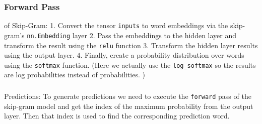\documentclass[
]{article}
\begin{document}
\hypertarget{forward-pass}{%
\subsubsection{Forward Pass}\label{forward-pass}}

of Skip-Gram: 1. Convert the tensor \texttt{inputs} to
word embeddings via the skip- gram's \texttt{nn.Embedding}
layer 2. Pass the embeddings to the hidden layer and transform the
result using the \texttt{relu} function 3. Transform the
hidden layer results using the output layer. 4. Finally, create a
probability distribution over words using the
\texttt{softmax} function. (Here we actually use the
\texttt{log_softmax} so the results are log probabilities
instead of probabilities. )

\hypertarget{section}{%
\subsubsection{}\label{section}}

Predictions: To generate predictions we need to execute the
\texttt{forward} pass of the skip-gram model and get the
index of the maximum probability from the output layer. Then that index
is used to find the corresponding prediction word.
\end{document}
